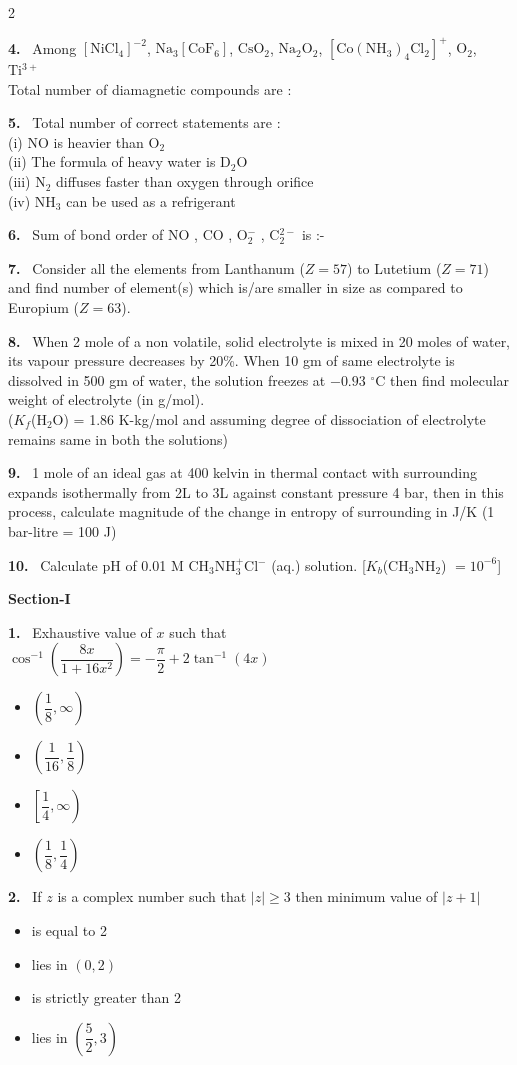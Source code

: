 \documentclass[10pt]{extarticle}
\newcommand{\partsec}[2]{\par\medskip\noindent{\large\bfseries PART-#1: #2}\par\smallskip}
\newcommand{\sect}[1]{\par\smallskip\noindent\textbf{#1}\par}
\newcommand{\qn}[1]{\par\smallskip\noindent\textbf{#1.}~}
\newenvironment{qoptions}{\begin{itemize}[leftmargin=1.8em,itemsep=1pt,topsep=2pt,label={}]}{\end{itemize}}
\newcommand{\opt}[2]{\item[(#1)] #2}
\begin{document}
\begin{multicols}{2}
\qn{4} Among $[\mathrm{NiCl_4}]^{-2}$, $\mathrm{Na_3[CoF_6]}$, $\mathrm{CsO_2}$, $\mathrm{Na_2O_2}$, $[\mathrm{Co(NH_3)_4Cl_2}]^+$, $\mathrm{O_2}$, $\mathrm{Ti^{3+}}$\\
Total number of diamagnetic compounds are :

\qn{5} Total number of correct statements are :\\
(i) NO is heavier than O$_2$\\
(ii) The formula of heavy water is D$_2$O\\
(iii) N$_2$ diffuses faster than oxygen through orifice\\
(iv) NH$_3$ can be used as a refrigerant

\qn{6} Sum of bond order of NO , CO , O$_2^-$ , C$_2^{2-}$ is :-

\qn{7} Consider all the elements from Lanthanum ($Z=57$) to Lutetium ($Z=71$) and find number of element(s) which is/are smaller in size as compared to Europium ($Z=63$).

\qn{8} When 2 mole of a non volatile, solid electrolyte is mixed in 20 moles of water, its vapour pressure decreases by 20\%. When 10 gm of same electrolyte is dissolved in 500 gm of water, the solution freezes at $-0.93$ $^\circ$C then find molecular weight of electrolyte (in g/mol).\\
($K_f$(H$_2$O) = 1.86 K-kg/mol and assuming degree of dissociation of electrolyte remains same in both the solutions)

\qn{9} 1 mole of an ideal gas at 400 kelvin in thermal contact with surrounding expands isothermally from 2L to 3L against constant pressure 4 bar, then in this process, calculate magnitude of the change in entropy of surrounding in J/K (1 bar-litre = 100 J)

\qn{10} Calculate pH of 0.01 M CH$_3$NH$_3^+$Cl$^-$ (aq.) solution. [$K_b$(CH$_3$NH$_2$) $=10^{-6}$]

\partsec{3}{MATHEMATICS}
\sect{Section-I}

\qn{1} Exhaustive value of $x$ such that\\
$\cos^{-1}\left(\dfrac{8x}{1+16x^2}\right)=-\dfrac\pi2+2\tan^{-1}(4x)$
\begin{qoptions}
\opt{A}{$\left(\dfrac18,\infty\right)$}
\opt{B}{$\left(\dfrac1{16},\dfrac18\right)$}
\opt{C}{$\left[\dfrac14,\infty\right)$}
\opt{D}{$\left(\dfrac18,\dfrac14\right)$}
\end{qoptions}

\qn{2} If $z$ is a complex number such that $|z|\geq3$ then minimum value of $|z+1|$
\begin{qoptions}
\opt{A}{is equal to 2}
\opt{B}{lies in $(0,2)$}
\opt{C}{is strictly greater than 2}
\opt{D}{lies in $\left(\dfrac52,3\right)$}
\end{qoptions}


\end{multicols}
\end{document}
